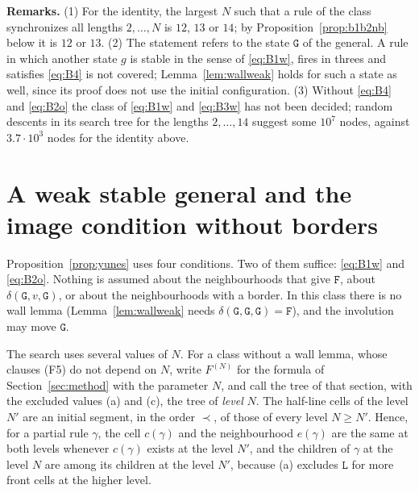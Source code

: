 \documentclass[11pt]{article}
\theoremstyle{remark}
\newcommand{\Lq}{\mathtt{L}}\newcommand{\Gq}{\mathtt{G}}\newcommand{\Aq}{\mathtt{A}}\newcommand{\Bq}{\mathtt{B}}\newcommand{\Fq}{\mathtt{F}}
\begin{document}
\noindent\textbf{Remarks.} (1) For the identity, the largest $N$ such that a rule of the class synchronizes
all lengths $2,\dots,N$ is $12$, $13$ or $14$; by Proposition~\ref{prop:b1b2nb} below it is $12$ or $13$. (2) The statement refers to the state $\Gq$ of the general. A
rule in which another state $g$ is stable in the sense of \eqref{eq:B1w}, fires in threes and satisfies
\eqref{eq:B4} is not covered; Lemma~\ref{lem:wallweak} holds for such a state as well, since its proof does not
use the initial configuration. (3) Without \eqref{eq:B4} and \eqref{eq:B2o} the class of \eqref{eq:B1w} and
\eqref{eq:B3w} has not been decided; random descents in its search tree for the lengths $2,\dots,14$ suggest
some $10^7$ nodes, against $3.7\cdot10^3$ nodes for the identity above.

\section{A weak stable general and the image condition without borders}\label{sec:b1b2nb}

Proposition~\ref{prop:yunes} uses four conditions. Two of them suffice: \eqref{eq:B1w} and \eqref{eq:B2o}.
Nothing is assumed about the neighbourhoods that give $\Fq$, about $\delta(\Gq,v,\Gq)$, or about the
neighbourhoods with a border. In this class there is no wall lemma (Lemma~\ref{lem:wallweak} needs
$\delta(\Gq,\Gq,\Gq)=\Fq$), and the involution may move $\Gq$.

The search uses several values of $N$. For a class without a wall lemma, whose clauses (F5) do not depend
on $N$, write $F^{(N)}$ for the formula of Section~\ref{sec:method} with the parameter $N$, and call the tree
of that section, with the excluded values (a) and (c), the tree of \emph{level} $N$. The half-line cells of
the level $N'$ are an initial segment, in the order $\prec$, of those of every level $N\ge N'$. Hence, for a
partial rule $\gamma$, the cell $c(\gamma)$ and the neighbourhood $e(\gamma)$ are the same at both levels
whenever $c(\gamma)$ exists at the level $N'$, and the children of $\gamma$ at the level $N$ are among its
children at the level $N'$, because (a) excludes $\Lq$ for more front cells at the higher level.
\end{document}
